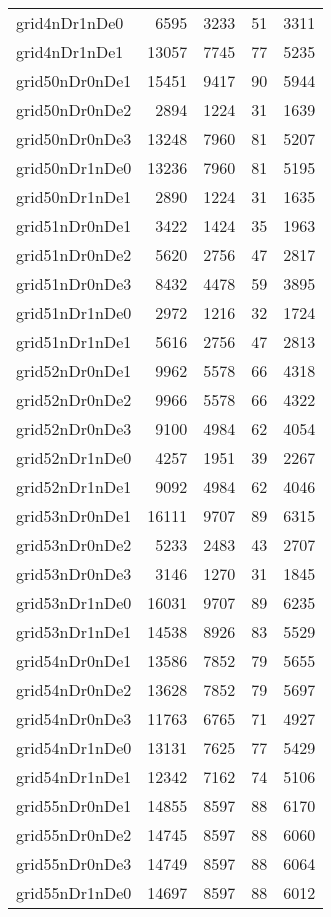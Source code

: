 \begin{longtable}{lrrrr}
grid4nDr1nDe0 & 6595 & 3233 & 51 & 3311 \\
grid4nDr1nDe1 & 13057 & 7745 & 77 & 5235 \\
grid50nDr0nDe1 & 15451 & 9417 & 90 & 5944 \\
grid50nDr0nDe2 & 2894 & 1224 & 31 & 1639 \\
grid50nDr0nDe3 & 13248 & 7960 & 81 & 5207 \\
grid50nDr1nDe0 & 13236 & 7960 & 81 & 5195 \\
grid50nDr1nDe1 & 2890 & 1224 & 31 & 1635 \\
grid51nDr0nDe1 & 3422 & 1424 & 35 & 1963 \\
grid51nDr0nDe2 & 5620 & 2756 & 47 & 2817 \\
grid51nDr0nDe3 & 8432 & 4478 & 59 & 3895 \\
grid51nDr1nDe0 & 2972 & 1216 & 32 & 1724 \\
grid51nDr1nDe1 & 5616 & 2756 & 47 & 2813 \\
grid52nDr0nDe1 & 9962 & 5578 & 66 & 4318 \\
grid52nDr0nDe2 & 9966 & 5578 & 66 & 4322 \\
grid52nDr0nDe3 & 9100 & 4984 & 62 & 4054 \\
grid52nDr1nDe0 & 4257 & 1951 & 39 & 2267 \\
grid52nDr1nDe1 & 9092 & 4984 & 62 & 4046 \\
grid53nDr0nDe1 & 16111 & 9707 & 89 & 6315 \\
grid53nDr0nDe2 & 5233 & 2483 & 43 & 2707 \\
grid53nDr0nDe3 & 3146 & 1270 & 31 & 1845 \\
grid53nDr1nDe0 & 16031 & 9707 & 89 & 6235 \\
grid53nDr1nDe1 & 14538 & 8926 & 83 & 5529 \\
grid54nDr0nDe1 & 13586 & 7852 & 79 & 5655 \\
grid54nDr0nDe2 & 13628 & 7852 & 79 & 5697 \\
grid54nDr0nDe3 & 11763 & 6765 & 71 & 4927 \\
grid54nDr1nDe0 & 13131 & 7625 & 77 & 5429 \\
grid54nDr1nDe1 & 12342 & 7162 & 74 & 5106 \\
grid55nDr0nDe1 & 14855 & 8597 & 88 & 6170 \\
grid55nDr0nDe2 & 14745 & 8597 & 88 & 6060 \\
grid55nDr0nDe3 & 14749 & 8597 & 88 & 6064 \\
grid55nDr1nDe0 & 14697 & 8597 & 88 & 6012 \\

\end{longtable}
